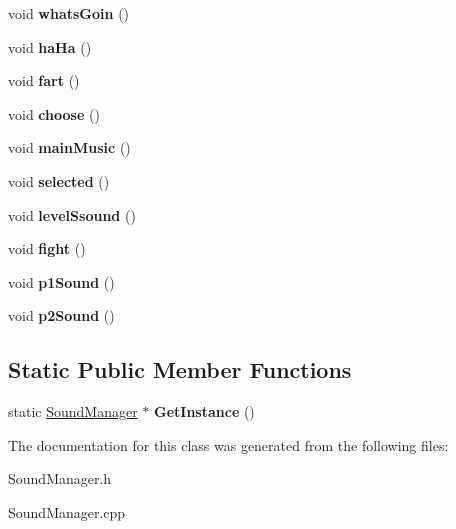 \begin{DoxyCompactItemize}
\item 
void {\bfseries whats\+Goin} ()\hypertarget{class_sound_manager_a55c90efaa1cef310446293889938a347}{}\label{class_sound_manager_a55c90efaa1cef310446293889938a347}

\item 
void {\bfseries ha\+Ha} ()\hypertarget{class_sound_manager_ab16682913eb74bbd2de6446f1b7d0132}{}\label{class_sound_manager_ab16682913eb74bbd2de6446f1b7d0132}

\item 
void {\bfseries fart} ()\hypertarget{class_sound_manager_aa524d3b86a268018663a1039902c69f6}{}\label{class_sound_manager_aa524d3b86a268018663a1039902c69f6}

\item 
void {\bfseries choose} ()\hypertarget{class_sound_manager_a565f384e6c2ad0b65d3e468cb7a25722}{}\label{class_sound_manager_a565f384e6c2ad0b65d3e468cb7a25722}

\item 
void {\bfseries main\+Music} ()\hypertarget{class_sound_manager_aec1358979f621857b518e0f521e5e369}{}\label{class_sound_manager_aec1358979f621857b518e0f521e5e369}

\item 
void {\bfseries selected} ()\hypertarget{class_sound_manager_a67d075e0eea7b9c5c4b7c67539b70389}{}\label{class_sound_manager_a67d075e0eea7b9c5c4b7c67539b70389}

\item 
void {\bfseries level\+Ssound} ()\hypertarget{class_sound_manager_a1982c64e2a26746eac30787508bc3fbd}{}\label{class_sound_manager_a1982c64e2a26746eac30787508bc3fbd}

\item 
void {\bfseries fight} ()\hypertarget{class_sound_manager_aa5d33e852e4dc9217b891aab889e434c}{}\label{class_sound_manager_aa5d33e852e4dc9217b891aab889e434c}

\item 
void {\bfseries p1\+Sound} ()\hypertarget{class_sound_manager_a3171d5302ad3505a62b06f073843205c}{}\label{class_sound_manager_a3171d5302ad3505a62b06f073843205c}

\item 
void {\bfseries p2\+Sound} ()\hypertarget{class_sound_manager_a65fe33fe8e3da84f58551f1a228b335b}{}\label{class_sound_manager_a65fe33fe8e3da84f58551f1a228b335b}

\end{DoxyCompactItemize}
\subsection*{Static Public Member Functions}
\begin{DoxyCompactItemize}
\item 
static \hyperlink{class_sound_manager}{Sound\+Manager} $\ast$ {\bfseries Get\+Instance} ()\hypertarget{class_sound_manager_a887480b38c9380c9fba23a2337df63be}{}\label{class_sound_manager_a887480b38c9380c9fba23a2337df63be}

\end{DoxyCompactItemize}


The documentation for this class was generated from the following files\+:\begin{DoxyCompactItemize}
\item 
Sound\+Manager.\+h\item 
Sound\+Manager.\+cpp\end{DoxyCompactItemize}
